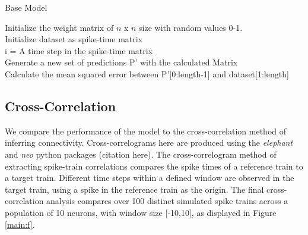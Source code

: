 \documentclass[11pt]{article}
\begin{document}
\begin{algorithm}
	\caption{Base Model}
	Initialize the weight matrix of $n$ x $n$ size with random values 0-1.\\
	Initialize dataset as spike-time matrix\\
	i = A time step in the spike-time matrix\\
	Generate a new set of predictions P' with the calculated Matrix\\
	Calculate the mean squared error between P'[0:length-1] and dataset[1:length]
\end{algorithm}

\subsection{Cross-Correlation}
We compare the performance of the model to the cross-correlation method of inferring connectivity. Cross-correlograms here are produced using the \textit{elephant} and \textit{neo} python packages (citation here). The cross-correlogram method of extracting spike-train correlations compares the spike times of a reference train to a target train. Different time steps within a defined window are observed in the target train, using a spike in the reference train as the origin. The final cross-correlation analysis compares over 100 distinct simulated spike trains across a population of 10 neurons, with window size [-10,10], as displayed in Figure \ref{main:f}.
\end{document}
